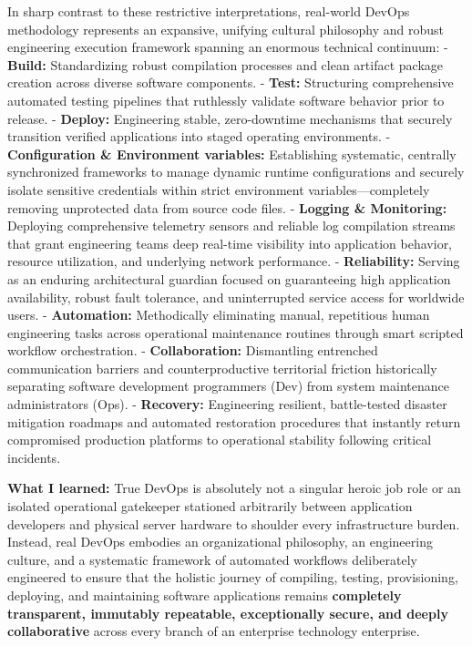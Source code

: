 In sharp contrast to these restrictive interpretations, real-world
DevOps methodology represents an expansive, unifying cultural philosophy
and robust engineering execution framework spanning an enormous
technical continuum: - \textbf{Build:} Standardizing robust compilation
processes and clean artifact package creation across diverse software
components. - \textbf{Test:} Structuring comprehensive automated testing
pipelines that ruthlessly validate software behavior prior to release. -
\textbf{Deploy:} Engineering stable, zero-downtime mechanisms that
securely transition verified applications into staged operating
environments. - \textbf{Configuration \& Environment variables:}
Establishing systematic, centrally synchronized frameworks to manage
dynamic runtime configurations and securely isolate sensitive
credentials within strict environment variables---completely removing
unprotected data from source code files. - \textbf{Logging \&
Monitoring:} Deploying comprehensive telemetry sensors and reliable log
compilation streams that grant engineering teams deep real-time
visibility into application behavior, resource utilization, and
underlying network performance. - \textbf{Reliability:} Serving as an
enduring architectural guardian focused on guaranteeing high application
availability, robust fault tolerance, and uninterrupted service access
for worldwide users. - \textbf{Automation:} Methodically eliminating
manual, repetitious human engineering tasks across operational
maintenance routines through smart scripted workflow orchestration. -
\textbf{Collaboration:} Dismantling entrenched communication barriers
and counterproductive territorial friction historically separating
software development programmers (Dev) from system maintenance
administrators (Ops). - \textbf{Recovery:} Engineering resilient,
battle-tested disaster mitigation roadmaps and automated restoration
procedures that instantly return compromised production platforms to
operational stability following critical incidents.

\textbf{What I learned:} True DevOps is absolutely not a singular heroic
job role or an isolated operational gatekeeper stationed arbitrarily
between application developers and physical server hardware to shoulder
every infrastructure burden. Instead, real DevOps embodies an
organizational philosophy, an engineering culture, and a systematic
framework of automated workflows deliberately engineered to ensure that
the holistic journey of compiling, testing, provisioning, deploying, and
maintaining software applications remains \textbf{completely
transparent, immutably repeatable, exceptionally secure, and deeply
collaborative} across every branch of an enterprise technology
enterprise.

